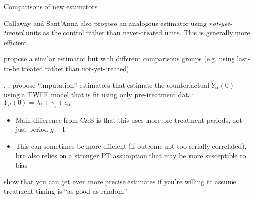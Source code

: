 \documentclass[aspectratio = 169, 13pt]{beamer}
\begin{document}
\begin{frame}{Comparisons of new estimators}
	\begin{wideitemize}
		\item
		Callaway and Sant'Anna also propose an analogous estimator using \textit{not-yet-treated} units as the control rather than never-treated units. This is generally more efficient.
		
		\vspace{-3mm}
		\item
		\citet{sun_estimating_2020} propose a similar estimator but with different comparisons groups (e.g. using last-to-be treated rather than not-yet-treated)
		
		\vspace{-3mm}
		\item
		\citet{borusyak_revisiting_2024}, \citet{Wooldridge2021a}, \citet{gardner_two-stage_2021} propose ``imputation'' estimators that estimate the counterfactual $\hat{Y}_{it}(0)$ using a TWFE model that is fit using only pre-treatment data: $Y_{it}(0) = \lambda_t + \gamma_i + \epsilon_{it}$
		\begin{itemize}
			\item Main difference from C\&S is that this uses more pre-treatment periods, not just period $g-1$
			
			\item This can sometimes be more efficient (if outcome not too serially correlated), but also relies on a stronger PT assumption that may be more susceptible to bias
		\end{itemize}
		
		\vspace{-3mm}
		\item \citet{roth_efficient_2023} show that you can get even more precise estimates if you're willing to assume treatment timing is ``as good as random''
		
	\end{wideitemize}
\end{frame}
\end{document}
